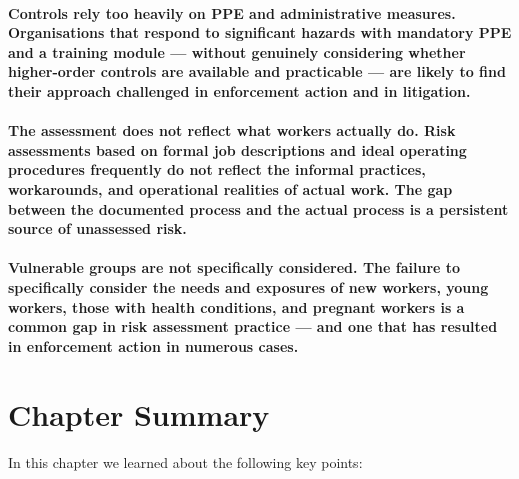 \paragraph{\textbf{Controls rely too heavily on PPE and administrative measures}. Organisations that respond to significant hazards with mandatory PPE and a training module — without genuinely considering whether higher-order controls are available and practicable — are likely to find their approach challenged in enforcement action and in litigation.}
\paragraph{\textbf{The assessment does not reflect what workers actually do}. Risk assessments based on formal job descriptions and ideal operating procedures frequently do not reflect the informal practices, workarounds, and operational realities of actual work. The gap between the documented process and the actual process is a persistent source of unassessed risk.}
\paragraph{\textbf{Vulnerable groups are not specifically considered}. The failure to specifically consider the needs and exposures of new workers, young workers, those with health conditions, and pregnant workers is a common gap in risk assessment practice — and one that has resulted in enforcement action in numerous cases.}

\newpage
\section{Chapter Summary}
In this chapter we learned about the following key points:

